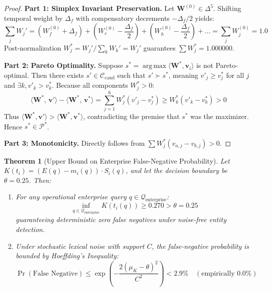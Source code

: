 \documentclass[conference,onecolumn,10pt]{IEEEtran}
\newtheorem{theorem}{Theorem}
\begin{document}
\begin{proof}
\textbf{Part 1: Simplex Invariant Preservation.}
Let $\mathbf{W}^{(0)} \in \Delta^5$. Shifting temporal weight by $\Delta_f$ with compensatory decrements $-\Delta_f/2$ yields:
\begin{equation}
    \sum_j W_j' = (W_f^{(0)} + \Delta_f) + \left(W_r^{(0)} - \frac{\Delta_f}{2}\right) + \left(W_h^{(0)} - \frac{\Delta_f}{2}\right) + \dots = \sum_j W_j^{(0)} = 1.0
\end{equation}
Post-normalization $W_j^* = W_j' / \sum_k W_k' = W_j'$ guarantees $\sum W_j^* = 1.000000$.

\textbf{Part 2: Pareto Optimality.}
Suppose $s^* = \operatorname{arg\,max} \langle \mathbf{W}^*, \mathbf{v}_i \rangle$ is not Pareto-optimal. Then there exists $s' \in \mathcal{C}_{\text{cand}}$ such that $s' \succ s^*$, meaning $v'_j \ge v^*_j$ for all $j$ and $\exists k, v'_k > v^*_k$. Because all components $W_j^* > 0$:
\begin{equation}
    \langle \mathbf{W}^*, \, \mathbf{v}' \rangle - \langle \mathbf{W}^*, \, \mathbf{v}^* \rangle = \sum_{j=1}^6 W_j^* (v'_j - v^*_j) \ge W_k^* (v'_k - v^*_k) > 0
\end{equation}
Thus $\langle \mathbf{W}^*, \mathbf{v}' \rangle > \langle \mathbf{W}^*, \mathbf{v}^* \rangle$, contradicting the premise that $s^*$ was the maximizer. Hence $s^* \in \mathcal{P}^*$.

\textbf{Part 3: Monotonicity.}
Directly follows from $\sum W_j^*(v_{a,j} - v_{b,j}) > 0$.
\end{proof}

\begin{theorem}[Upper Bound on Enterprise False-Negative Probability]
\label{thm:safety}
Let $K(t_i) = (E(q) - m_i(q)) \cdot S_i(q)$, and let the decision boundary be $\theta = 0.25$. Then:
\begin{enumerate}
    \item For any operational enterprise query $q \in \mathcal{Q}_{\text{enterprise}}$:
    \begin{equation}
        \inf_{q \in \mathcal{Q}_{\text{enterprise}}} K(t_i(q)) \ge 0.270 > \theta = 0.25
    \end{equation}
    guaranteeing deterministic zero false negatives under noise-free entity detection.
    \item Under stochastic lexical noise with support $C$, the false-negative probability is bounded by Hoeffding's Inequality:
    \begin{equation}
        \Pr(\text{False Negative}) \le \exp\left( - \frac{2 (\mu_K - \theta)^2}{C^2} \right) < 2.9\% \quad (\text{empirically } 0.0\%)
    \end{equation}
\end{enumerate}
\end{theorem}
\end{document}
